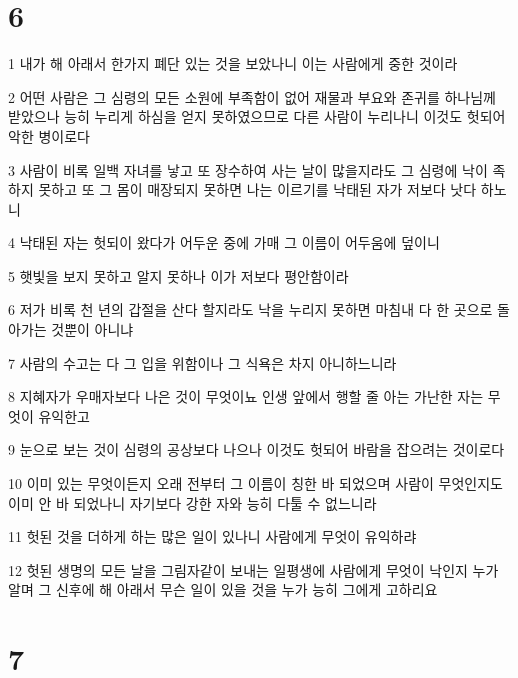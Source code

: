 \chapter{6}

\par 1 내가 해 아래서 한가지 폐단 있는 것을 보았나니 이는 사람에게 중한 것이라
\par 2 어떤 사람은 그 심령의 모든 소원에 부족함이 없어 재물과 부요와 존귀를 하나님께 받았으나 능히 누리게 하심을 얻지 못하였으므로 다른 사람이 누리나니 이것도 헛되어 악한 병이로다
\par 3 사람이 비록 일백 자녀를 낳고 또 장수하여 사는 날이 많을지라도 그 심령에 낙이 족하지 못하고 또 그 몸이 매장되지 못하면 나는 이르기를 낙태된 자가 저보다 낫다 하노니
\par 4 낙태된 자는 헛되이 왔다가 어두운 중에 가매 그 이름이 어두움에 덮이니
\par 5 햇빛을 보지 못하고 알지 못하나 이가 저보다 평안함이라
\par 6 저가 비록 천 년의 갑절을 산다 할지라도 낙을 누리지 못하면 마침내 다 한 곳으로 돌아가는 것뿐이 아니냐
\par 7 사람의 수고는 다 그 입을 위함이나 그 식욕은 차지 아니하느니라
\par 8 지혜자가 우매자보다 나은 것이 무엇이뇨 인생 앞에서 행할 줄 아는 가난한 자는 무엇이 유익한고
\par 9 눈으로 보는 것이 심령의 공상보다 나으나 이것도 헛되어 바람을 잡으려는 것이로다
\par 10 이미 있는 무엇이든지 오래 전부터 그 이름이 칭한 바 되었으며 사람이 무엇인지도 이미 안 바 되었나니 자기보다 강한 자와 능히 다툴 수 없느니라
\par 11 헛된 것을 더하게 하는 많은 일이 있나니 사람에게 무엇이 유익하랴
\par 12 헛된 생명의 모든 날을 그림자같이 보내는 일평생에 사람에게 무엇이 낙인지 누가 알며 그 신후에 해 아래서 무슨 일이 있을 것을 누가 능히 그에게 고하리요

\chapter{7}

